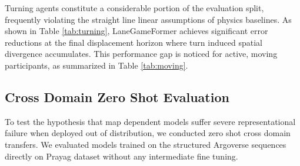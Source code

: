 \documentclass{article}
\begin{document}
Turning agents constitute a considerable portion of the evaluation split, frequently violating the straight line linear assumptions of physics baselines. As shown in Table \ref{tab:turning}, LaneGameFormer achieves significant error reductions at the final displacement horizon where turn induced spatial divergence accumulates. This performance gap is noticed for active, moving participants, as summarized in Table \ref{tab:moving}.

\begin{table}[htbp]
\centering
\caption{Performance on Turning Agents (m)}
\label{tab:turning}
\end{table}

\begin{table}[htbp]
\centering
\caption{Performance on Moving Agents (m)}
\label{tab:moving}
\end{table}

\subsection{Cross Domain Zero Shot Evaluation}
To test the hypothesis that map dependent models suffer severe representational failure when deployed out of distribution, we conducted zero shot cross domain transfers. We evaluated models trained on the structured Argoverse sequences directly on Prayag dataset without any intermediate fine tuning.
\end{document}

